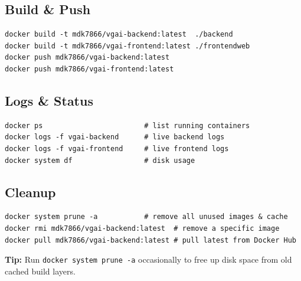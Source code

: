 \documentclass[12pt]{article}
\newenvironment{codeblock}{%
  \needspace{6\baselineskip}%
  \noindent\minipage{\linewidth}%
}{%
  \endminipage%
}
\begin{document}
\subsection{Build \& Push}
\begin{codeblock}
\begin{lstlisting}[style=commandstyle]
docker build -t mdk7866/vgai-backend:latest  ./backend
docker build -t mdk7866/vgai-frontend:latest ./frontendweb
docker push mdk7866/vgai-backend:latest
docker push mdk7866/vgai-frontend:latest
\end{lstlisting}
\end{codeblock}

\subsection{Logs \& Status}
\begin{codeblock}
\begin{lstlisting}[style=commandstyle]
docker ps                        # list running containers
docker logs -f vgai-backend      # live backend logs
docker logs -f vgai-frontend     # live frontend logs
docker system df                 # disk usage
\end{lstlisting}
\end{codeblock}

\subsection{Cleanup}
\begin{codeblock}
\begin{lstlisting}[style=commandstyle]
docker system prune -a           # remove all unused images & cache
docker rmi mdk7866/vgai-backend:latest  # remove a specific image
docker pull mdk7866/vgai-backend:latest # pull latest from Docker Hub
\end{lstlisting}
\end{codeblock}

\begin{tipbox}
\textbf{Tip:} Run \texttt{docker system prune -a} occasionally to free up disk space from old cached build layers.
\end{tipbox}
\end{document}
